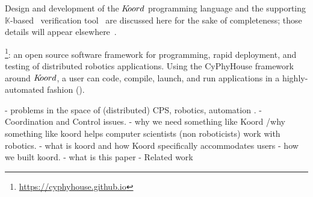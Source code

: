 Design and development of the $K\kern-2pt oord$ programming language and the supporting $\mathbb{K}$-based~\cite{Kpaper} verification tool \kbmc\, are discussed here for the sake of completeness; those details will appear elsewhere~\cite{koordreport}.




\footnote{\href{https://cyphyhouse.github.io/index.html}{https://cyphyhouse.github.io}}: an open source software framework for programming, rapid deployment, and testing of distributed robotics applications. 
Using the CyPhyHouse framework around $K\kern-2pt oord$, a user can code, compile, launch, and run applications in a highly-automated fashion (). 


    - problems in the space of (distributed) CPS, robotics, automation .
    - Coordination and Control issues. 
    - why we need something like Koord /why something like koord helps computer scientists (non roboticists) work with robotics. 
    - what is koord and how Koord specifically accommodates users
    - how we built koord. 
    - what is this paper
    - Related work
    
